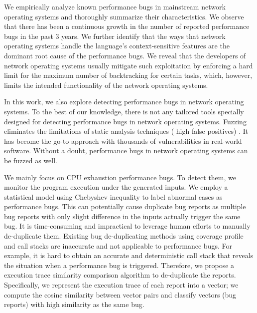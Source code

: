 We empirically analyze \XX known performance bugs in mainstream network operating systems and thoroughly summarize their characteristics.
%
We observe that there has been a continuous growth in the number of reported performance bugs in the past 3 years.
%
We further identify that the ways that network operating systems handle the language's context-sensitive features are the dominant root cause of the performance bugs.
%
We reveal that the developers of network operating systems usually mitigate such exploitation by enforcing a hard limit for the maximum number of backtracking for certain tasks, which, however, limits the intended functionality of the network operating systems.


In this work, we also explore detecting performance bugs in network operating systems.
%
To the best of our knowledge, there is not any tailored tools specially designed for detecting performance bugs in network operating systems.
%
Fuzzing \cite{slowfuzz, hotfuzz, perffuzz} eliminates the limitations of static analysis techniques 
(\eg{,} high false positives) 
\cite{perfbugstudy, nistor2013toddler,nistor2015caramel}.
%
It has become the go-to approach with thousands of vulnerabilities in real-world software.
%
Without a doubt, performance bugs in network operating systems can be fuzzed as well.
%
%
%
%
%
%

We mainly focus on CPU exhaustion performance bugs.
%
To detect them, we monitor the program execution under the generated inputs.
%
We employ a statistical model using Chebyshev inequality to label abnormal cases as performance bugs.
%
This can potentially cause duplicate bug reports as multiple bug reports with only slight difference in the inputs actually trigger the same bug.
%
It is time-consuming and impractical to leverage human efforts to manually de-duplicate them.
%
Existing bug de-duplicating methods using coverage profile and call stacks are inaccurate and not applicable to performance bugs.
%
For example, it is hard to obtain an accurate and deterministic call stack that reveals the situation when a performance bug is triggered.
%
Therefore, we propose a execution trace similarity comparison algorithm to de-duplicate the reports.
%
Specifically, we represent the execution trace of each report into a vector;
%
we compute the cosine similarity between vector pairs and classify vectors (bug reports) with high similarity as the same bug.
%

